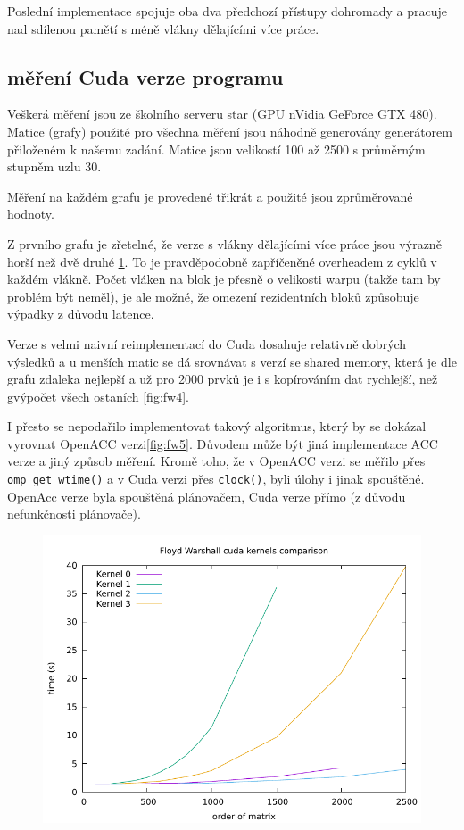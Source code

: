 \documentclass[11pt, fleqn]{article}
\begin{document}
Poslední implementace spojuje oba dva předchozí přístupy dohromady a pracuje nad sdílenou pamětí s méně vlákny dělajícími více práce.

\subsection{měření Cuda verze programu}

Veškerá měření jsou ze školního serveru star (GPU nVidia GeForce GTX 480). Matice (grafy) použité pro všechna měření jsou náhodně generovány generátorem přiloženém k našemu zadání. Matice jsou velikostí 100 až 2500 s průměrným stupněm uzlu 30.

Měření na každém grafu je provedené třikrát a použité jsou zprůměrované hodnoty.

Z prvního grafu je zřetelné, že verze s vlákny dělajícími více práce jsou výrazně horší než dvě druhé \ref{fig:fw3}. To je pravděpodobně zapříčeněné overheadem z cyklů v každém vlákně. Počet vláken na blok je přesně o velikosti warpu (takže tam by problém být neměl), je ale možné, že omezení rezidentních bloků způsobuje výpadky z důvodu latence.

Verze s velmi naivní reimplementací do Cuda dosahuje relativně dobrých výsledků a u menších matic se dá srovnávat s verzí se shared memory, která je dle grafu zdaleka nejlepší a už pro 2000 prvků je i s kopírováním dat rychlejší, než gvýpočet všech ostaních \ref{fig:fw4}. 

I přesto se nepodařilo implementovat takový algoritmus, který by se dokázal vyrovnat OpenACC verzi\ref{fig:fw5}. Důvodem může být jiná implementace ACC verze a jiný způsob měření. Kromě toho, že v OpenACC verzi se měřilo přes \lstinline{omp_get_wtime()} a v Cuda verzi přes \lstinline{clock()}, byli úlohy i jinak spouštěné. OpenAcc verze byla spouštěná plánovačem, Cuda verze přímo (z důvodu nefunkčnosti plánovače).

\begin{figure}
  \centering
  \includegraphics[width=.7\linewidth]{../results/FW_Cuda.pdf}
  \label{fig:fw3}
\end{figure}
\end{document}
